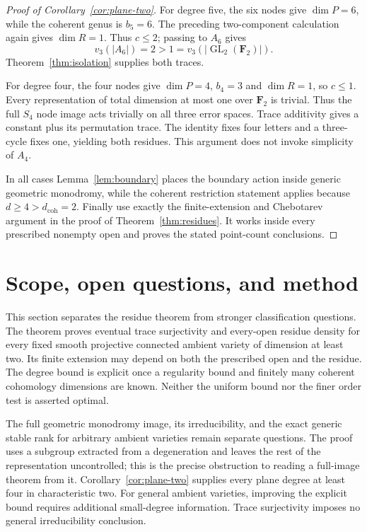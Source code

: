 \documentclass[11pt]{article}
\theoremstyle{remark}\newtheorem{remark}[theorem]{Remark}
\newcommand{\FF}{\mathbf F}
\newcommand{\GL}{\operatorname{GL}}
\begin{document}
\begin{proof}[Proof of Corollary~\ref{cor:plane-two}]
For degree five, the six nodes give $\dim P=6$, while the coherent genus is $b_5=6$. The preceding two-component calculation again gives $\dim R=1$. Thus $c\le2$; passing to $A_6$ gives
\[
                  v_3(|A_6|)=2>1=v_3(|\GL_2(\FF_2)|).
\]
Theorem~\ref{thm:isolation} supplies both traces.

For degree four, the four nodes give $\dim P=4$, $b_4=3$ and $\dim R=1$, so $c\le1$. Every representation of total dimension at most one over $\FF_2$ is trivial. Thus the full $S_4$ node image acts trivially on all three error spaces. Trace additivity gives a constant plus its permutation trace. The identity fixes four letters and a three-cycle fixes one, yielding both residues. This argument does not invoke simplicity of $A_4$.

In all cases Lemma~\ref{lem:boundary} places the boundary action inside generic geometric monodromy, while the coherent restriction statement applies because $d\ge4>d_{\mathrm{coh}}=2$. Finally use exactly the finite-extension and Chebotarev argument in the proof of Theorem~\ref{thm:residues}. It works inside every prescribed nonempty open and proves the stated point-count conclusions.
\end{proof}

\section{Scope, open questions, and method}\label{sec:scope}

This section separates the residue theorem from stronger classification questions. The theorem proves eventual trace surjectivity and every-open residue density for every fixed smooth projective connected ambient variety of dimension at least two. Its finite extension may depend on both the prescribed open and the residue. The degree bound is explicit once a regularity bound and finitely many coherent cohomology dimensions are known. Neither the uniform bound nor the finer order test is asserted optimal.

The full geometric monodromy image, its irreducibility, and the exact generic stable rank for arbitrary ambient varieties remain separate questions. The proof uses a subgroup extracted from a degeneration and leaves the rest of the representation uncontrolled; this is the precise obstruction to reading a full-image theorem from it. Corollary~\ref{cor:plane-two} supplies every plane degree at least four in characteristic two. For general ambient varieties, improving the explicit bound requires additional small-degree information. Trace surjectivity imposes no general irreducibility conclusion.
\end{document}
